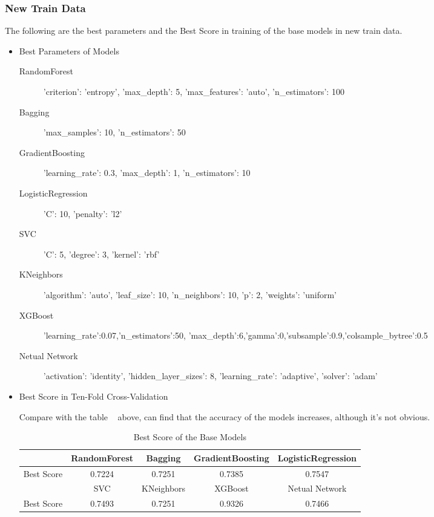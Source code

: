 \subsubsection{New Train Data}

The following are the best parameters and 
the Best Score in training of 
the base models 
in new train data. 

\begin{itemize}
	\item Best Parameters of Models
	\begin{description}
		\item[RandomForest] 'criterion': 'entropy', 'max_depth': 5, 
		'max_features': 'auto', 'n_estimators': 100 
		\item[Bagging] 'max_samples': 10, 'n_estimators': 50
		\item[GradientBoosting] 'learning_rate': 0.3, 
		'max_depth': 1, 'n_estimators': 10
		\item[LogisticRegression] 'C': 10, 'penalty': 'l2'
		\item[SVC] 'C': 5, 'degree': 3, 'kernel': 'rbf'
		\item[KNeighbors] 'algorithm': 'auto', 'leaf_size': 10, 
		'n_neighbors': 10, 'p': 2, 'weights': 'uniform' 
		\item[XGBoost] 'learning_rate':0.07,'n_estimators':50,
		'max_depth':6,'gamma':0,'subsample':0.9,'colsample_bytree':0.5
		\item[Netual Network] 'activation': 'identity', 
		'hidden_layer_sizes': 8, 'learning_rate': 'adaptive', 'solver': 'adam'
	\end{description}
	
	\item Best Score in Ten-Fold Cross-Validation
	
	Compare with the table ~
	above,
	can find that the accuracy of the models increases,
	although it's not obvious.
	
	\begin{table}[h]  \centering
		\caption{Best Score of the Base Models}
		\label{tbl:best_score_base_models_new}
		\begin{tabular}{ccccc}
			\toprule
			& RandomForest & Bagging & GradientBoosting & 
			LogisticRegression \\
			\midrule
			Best Score & 0.7224 & 0.7251 & 0.7385 & 
			0.7547 \\
			\bottomrule
			\toprule 
			& SVC & KNeighbors & XGBoost & Netual Network\\
			\midrule
			Best Score & 0.7493 & 0.7251 & 0.9326 & 0.7466\\
			\bottomrule
		\end{tabular}
	\end{table}
\end{itemize}


